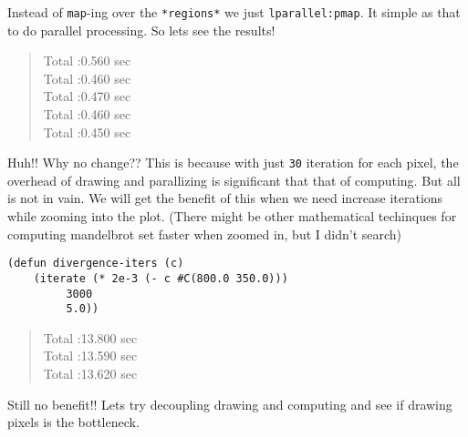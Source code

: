 \documentclass[11pt,a4paper]{article}
\begin{document}
Instead of \texttt{map}-ing over the \texttt{*regions*} we just \texttt{lparallel:pmap}. It simple as that to do parallel processing. 
So lets see the results!

\begin{verse}
Total  :0.560 sec\\
Total  :0.460 sec\\
Total  :0.470 sec\\
Total  :0.460 sec\\
Total  :0.450 sec\\
\end{verse}

Huh!! Why no change?? This is because with just \texttt{30} iteration for each pixel, the overhead of drawing and parallizing is significant that that of computing. But all is not in vain. We will get the benefit of this when we need increase iterations while zooming into the plot. (There might be other mathematical techinques for computing mandelbrot set faster when zoomed in, but I didn't search)

\begin{lstlisting}
(defun divergence-iters (c)
    (iterate (* 2e-3 (- c #C(800.0 350.0)))
	     3000
	     5.0))
\end{lstlisting}

\begin{verse}
Total  :13.800 sec\\
Total  :13.590 sec\\
Total  :13.620 sec\\
\end{verse}
Still no benefit!! Lets try decoupling drawing and computing and see if drawing pixels is the bottleneck.
\end{document}
